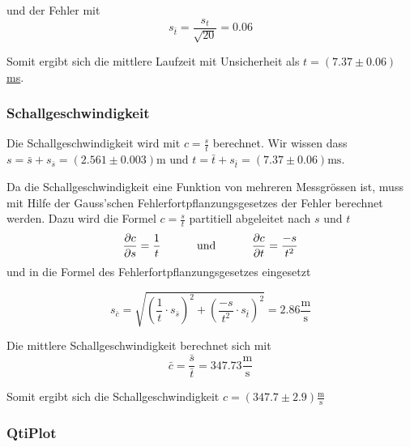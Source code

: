 und der Fehler mit
\begin{equation}
    s_{\bar{t}} = \frac{s_t}{\sqrt{20}} = 0.06
\end{equation}

Somit ergibt sich die mittlere Laufzeit mit Unsicherheit als \underline{\underline{$t = (7.37 \pm 0.06)$ ms}}.


\subsubsection*{Schallgeschwindigkeit}

Die Schallgeschwindigkeit wird mit $c=\frac{s}{t}$ berechnet. Wir wissen dass
$s=\bar{s}+s_{\bar{s}}=(2.561\pm0.003) \textrm{m}$
und
$t=\bar{t}+s_{\bar{t}}=(7.37\pm0.06) \textrm{ms}$.

Da die Schallgeschwindigkeit eine Funktion von mehreren Messgr\"ossen ist, muss mit Hilfe der
Gauss'schen Fehlerfortpflanzungsgesetzes der Fehler berechnet werden. Dazu wird die Formel $c=\frac{s}{t}$
partitiell abgeleitet nach $s$ und $t$
\begin{equation}
	\frac{\partial c}{\partial s} = \frac{1}{t} \textrm{\hspace{10mm} und \hspace{10mm}} \frac{\partial c}{\partial{t}} = \frac{-s}{t^2}
\end{equation}
und in die Formel des Fehlerfortpflanzungsgesetzes eingesetzt

\begin{equation}
	s_{\bar{c}} = \sqrt{(\frac{1}{t} \cdot s_{\bar{s}})^2 + (\frac{-s}{t^2} \cdot s_{\bar{t}})^2} = 2.86 \frac{\textrm{m}}{\textrm{s}}
\end{equation}

Die mittlere Schallgeschwindigkeit berechnet sich mit
\begin{equation}
	\bar{c}=\frac{\bar{s}}{\bar{t}} = 347.73 \frac{\textrm{m}}{\textrm{s}}
\end{equation}

Somit ergibt sich die Schallgeschwindigkeit
\underline{\underline{$c=(347.7 \pm 2.9) \frac{\textrm{m}}{\textrm{s}}$}}


\subsubsection*{QtiPlot}

